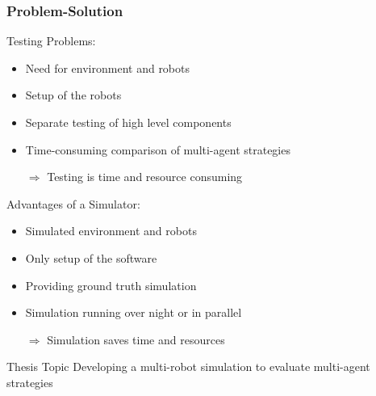 \documentclass[]{beamer}
\begin{document}
\begin{frame}
\frametitle{Problem-Solution}
\begin{multicols}{2}
Testing Problems:
\begin{itemize}
\item Need for environment and robots 
\item Setup of the robots  %
\item Separate testing of high level components
\item Time-consuming comparison of multi-agent strategies
\pause
\item[$\Rightarrow$] Testing is time and resource consuming
\end{itemize}
\pause
Advantages of a Simulator:
\begin{itemize}
\item Simulated environment and robots
\item Only setup of the software
\item Providing ground truth simulation
\item Simulation running over night or in parallel
\pause
\item[$\Rightarrow$] Simulation saves time and resources
\end{itemize}
\end{multicols}
\pause
\begin{block}{Thesis Topic}
Developing a multi-robot simulation to evaluate multi-agent strategies
\end{block}
\end{frame}
\end{document}
